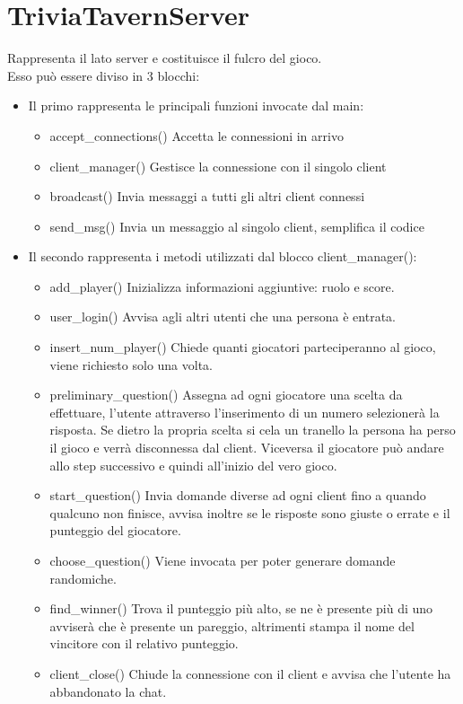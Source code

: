 \documentclass[a4paper,12pt]{report}
\begin{document}
    \section{TriviaTavernServer}
    Rappresenta il lato server e costituisce il fulcro del gioco. \\
    Esso può essere diviso in 3 blocchi: \\
    \begin{itemize}
        \item Il primo rappresenta le principali funzioni invocate dal main:
            \begin{itemize}
                \item accept\_connections() Accetta le connessioni in arrivo 
                \item client\_manager() Gestisce la connessione con il singolo client
                \item broadcast() Invia messaggi a tutti gli altri client connessi
                \item send\_msg() Invia un messaggio al singolo client, semplifica il codice
             \end{itemize}
            
        \item Il secondo rappresenta i metodi utilizzati dal blocco client\_manager():
            \begin{itemize}
                \item add\_player() Inizializza informazioni aggiuntive: ruolo e score.
                \item user\_login() Avvisa agli altri utenti che una persona è entrata.
                \item insert\_num\_player() Chiede quanti giocatori parteciperanno al gioco, viene richiesto solo una volta.
                \item preliminary\_question() Assegna ad ogni giocatore una scelta da effettuare, l'utente attraverso l'inserimento di un numero selezionerà la risposta. Se dietro la propria scelta si cela un tranello la persona ha perso il gioco e verrà disconnessa dal client. Viceversa il giocatore può andare allo step successivo e quindi all'inizio del vero gioco.
                \item start\_question() Invia domande diverse ad ogni client fino a quando qualcuno non finisce, avvisa inoltre se le risposte sono giuste o errate e il punteggio del giocatore.
                \item choose\_question() Viene invocata per poter generare domande randomiche.
                \item find\_winner() Trova il punteggio più alto, se ne è presente più di uno avviserà che è presente un pareggio, altrimenti stampa il nome del vincitore con il relativo punteggio.
                \item client\_close() Chiude la connessione con il client e avvisa che l'utente ha abbandonato la chat.
            \end{itemize}  
            

\end{itemize}
\end{document}
